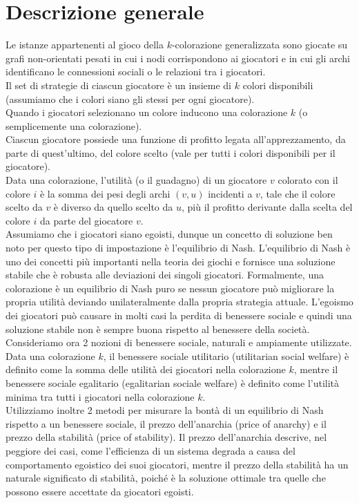 \section{Descrizione generale}
\justify
Le istanze appartenenti al gioco della \(k\)-colorazione generalizzata sono giocate su grafi non-orientati pesati in cui i nodi corrispondono ai giocatori e in cui gli archi identificano le connessioni sociali o le relazioni tra i giocatori.\\
Il set di strategie di ciascun giocatore è un insieme di \(k\) colori disponibili (assumiamo che i colori siano gli stessi per ogni giocatore).\\
Quando i giocatori selezionano un colore inducono una colorazione \(k\) (o semplicemente una colorazione).\\
Ciascun giocatore possiede una funzione di profitto legata all'apprezzamento, da parte di quest'ultimo, del colore scelto (vale per tutti i colori disponibili per il giocatore).\\
Data una colorazione, l'utilità (o il guadagno) di un giocatore \(v\) colorato con il colore \(i\) è la somma dei pesi degli archi \((v, u)\) incidenti a \(v\), tale che il colore scelto da \(v\) è diverso da quello scelto da \(u\), più il profitto derivante dalla scelta del colore \(i\) da parte del giocatore \(v\).\\
Assumiamo che i giocatori siano egoisti, dunque un concetto di soluzione ben noto per questo tipo di impostazione è l'equilibrio di Nash. L'equilibrio di Nash è uno dei concetti più importanti nella teoria dei giochi e fornisce una soluzione stabile che è robusta alle deviazioni dei singoli giocatori. Formalmente, una colorazione è un equilibrio di Nash puro se nessun giocatore può migliorare la propria utilità deviando unilateralmente dalla propria strategia attuale. L'egoismo dei giocatori può causare in molti casi la perdita di benessere sociale e quindi una soluzione stabile non è sempre buona rispetto al benessere della società.\\
Consideriamo ora 2 nozioni di benessere sociale, naturali e ampiamente utilizzate. Data una colorazione \(k\), il benessere sociale utilitario (utilitarian social welfare) è definito come la somma delle utilità dei giocatori nella colorazione \(k\), mentre il benessere sociale egalitario (egalitarian sociale welfare) è definito come l'utilità minima tra tutti i giocatori nella colorazione \(k\).\\
Utilizziamo inoltre 2 metodi per misurare la bontà di un equilibrio di Nash rispetto a un benessere sociale, il prezzo dell'anarchia (price of anarchy) e il prezzo della stabilità (price of stability). Il prezzo dell'anarchia descrive, nel peggiore dei casi, come l'efficienza di un sistema degrada a causa del comportamento egoistico dei suoi giocatori, mentre il prezzo della stabilità ha un naturale significato di stabilità, poiché è la soluzione ottimale tra quelle che possono essere accettate da giocatori egoisti.\\
